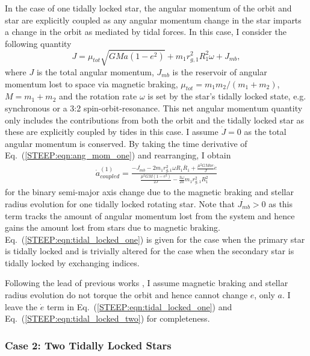 In the case of one tidally locked star, the angular momentum of the orbit and star are explicitly coupled as any angular momentum change in the star imparts a change in the orbit as mediated by tidal forces.  In this case, I consider the following quantity
\begin{equation} \label{STEEP:eqn:ang_mom_one}
J = \mu_{tot} \sqrt{GMa(1-e^2)} + m_1 r_{g,1}^2 R_1^2 \omega + J_{mb},
\end{equation}
where $J$ is the total angular momentum, $J_{mb}$ is the reservoir of angular momentum lost to space via magnetic braking, $\mu_{tot} = m_1 m_2 / (m_1 + m_2)$, $M = m_1 + m_2$ and the rotation rate $\omega$ is set by the star's tidally locked state, e.g. synchronous or a 3:2 spin-orbit-resonance.  This net angular momentum quantity only includes the contributions from both the orbit and the tidally locked star as these are explicitly coupled by tides in this case.  I assume $\dot{J} = 0$ as the total angular momentum is conserved.  By taking the time derivative of Eq.~(\ref{STEEP:eqn:ang_mom_one}) and rearranging, I obtain
\begin{equation} \label{STEEP:eqn:tidal_locked_one}
\begin{split}
\dot{a}_{coupled}^{(1)} = \frac{-\dot{J_{mb}} - 2 m_1 r_{g,1}^2 \omega R_1 \dot{R_1} + \frac{\mu^2 G M a e }{J} \dot{e}}
{\frac{\mu^2 G M (1-e^2)}{2J} - \frac{3 \omega}{2a} m_1 r_{g,1}^2 R_1^2}
\end{split}
\end{equation}
for the binary semi-major axis change due to the magnetic braking and stellar radius evolution for one tidally locked rotating star.  Note that $\dot{J_{mb}} > 0$ as this term tracks the amount of angular momentum lost from the system and hence gains the amount lost from stars due to magnetic braking.  Eq.~(\ref{STEEP:eqn:tidal_locked_one}) is given for the case when the primary star is tidally locked and is trivially altered for the case when the secondary star is tidally locked by exchanging indices. 

Following the lead of previous works \citep[e.g.][]{Verbunt1981,Repetto2014}, I assume magnetic braking and stellar radius evolution do not torque the orbit and hence cannot change $e$, only $a$.  I leave the $\dot{e}$ term in Eq.~(\ref{STEEP:eqn:tidal_locked_one}) and Eq.~(\ref{STEEP:eqn:tidal_locked_two}) for completeness.

\subsubsection{Case 2: Two Tidally Locked Stars}

